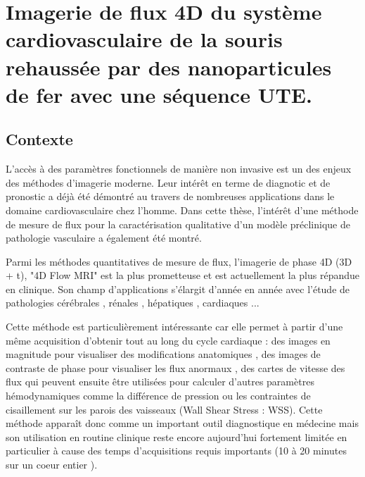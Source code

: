 \chapter{Imagerie de flux 4D du système cardiovasculaire de la souris rehaussée par des nanoparticules de fer avec une séquence UTE.}
\setlength{\footskip}{50pt}
\label{Chap6}
\section{Contexte}

L'accès à des paramètres fonctionnels de manière non invasive est un des enjeux des méthodes d'imagerie moderne. Leur intérêt en terme de diagnotic et de pronostic a déjà été démontré au travers de nombreuses applications dans le domaine cardiovasculaire chez l'homme. Dans cette thèse, l'intérêt d'une méthode de mesure de flux pour la caractérisation qualitative d'un modèle préclinique de pathologie vasculaire a également été montré.

Parmi les méthodes quantitatives de mesure de flux, l'imagerie de phase 4D (3D + t), "4D Flow MRI" est la plus prometteuse et est actuellement la plus répandue en clinique. Son champ d'applications s'élargit d'année en année avec l'étude de pathologies cérébrales \cite{meckel2008vivo,hope2010evaluation}, rénales \cite{franccois2011renal}, hépatiques \cite{stankovic2010mr}, cardiaques \cite{geiger20114d,markl2011time} ...

Cette méthode est particulièrement intéressante car elle permet à partir d'une même acquisition d'obtenir tout au long du cycle cardiaque : des images en magnitude pour visualiser des modifications anatomiques  \cite{Eriksson:2013aa}, des images de contraste de phase pour visualiser les flux anormaux \cite{Velikina:2010hc}, des cartes de vitesse des flux \cite{Garcia:2014aa} qui peuvent ensuite être utilisées pour calculer d'autres paramètres hémodynamiques comme la différence de pression \cite{Tyszka:2000aa,bock2011vivo} ou les contraintes de cisaillement sur les parois des vaisseaux (Wall Shear Stress : WSS)\cite{Zhao:2009ng}. Cette méthode apparaît donc comme un important outil diagnostique en médecine mais son utilisation en routine clinique reste encore aujourd'hui fortement limitée en particulier à cause des temps d'acquisitions requis importants (10 à 20 minutes sur un coeur entier \cite{Markl:2012pi}).

